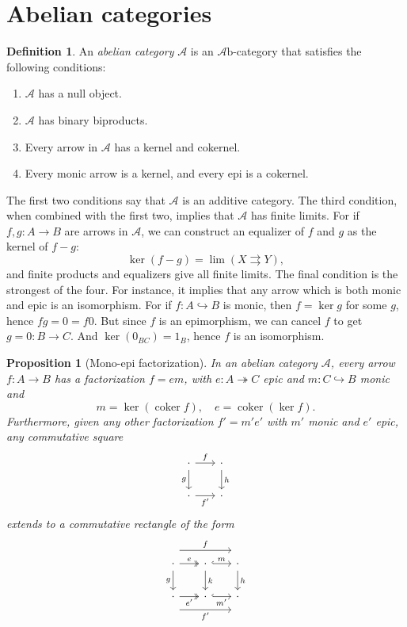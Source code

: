 \documentclass[10pt,oneside]{book}
\def\~#1{\mathscr{#1}}
\newcommand{\epi}{\twoheadrightarrow}
\newcommand{\mono}{\hookrightarrow}
\newcommand{\coker}{\mathop{\mathrm{coker}}}
\newcommand{\Ab}{\~A\mathrm{b}}
\theoremstyle{plain}
\newtheorem{prop}[thm]{Proposition}
\theoremstyle{definition}
\newtheorem{defn}[thm]{Definition}
\theoremstyle{remark}
\numberwithin{equation}{section}
\numberwithin{figure}{section}
\begin{document}
\section{Abelian categories}

\begin{defn}
    An \emph{abelian category} $\~A$ is an $\Ab$-category that satisfies the following conditions:
    \begin{enumerate}[label=(\roman*)]
        \item $\~A$ has a null object.
        \item $\~A$ has binary biproducts.
        \item Every arrow in $\~A$ has a kernel and cokernel.
        \item Every monic arrow is a kernel, and every epi is a cokernel.
    \end{enumerate}
\end{defn}

The first two conditions say that $\~A$ is an additive category. The third condition, when combined with the first two, implies that $\~A$ has finite limits. For if $f, g: A \to B$ are arrows in $\~A$, we can construct an equalizer of $f$ and $g$ as the kernel of $f - g$:
\[\ker(f-g) = \lim(X \rightrightarrows Y),\]
and finite products and equalizers give all finite limits. The final condition is the strongest of the four. For instance, it implies that any arrow which is both monic and epic is an isomorphism. For if $f: A \mono B$ is monic, then $f = \ker g$ for some $g$, hence $fg = 0 = f0$. But since $f$ is an epimorphism, we can cancel $f$ to get $g = 0: B \to C$. And $\ker(0_{BC}) = 1_B$, hence $f$ is an isomorphism.

\begin{prop}[Mono-epi factorization]
    In an abelian category $\~A$, every arrow $f:A \to B$ has a factorization $f = em$, with $e: A \epi C$ epic and $m: C \mono B$ monic and
    \[m = \ker(\coker f), \quad e = \coker(\ker f).\] 
    Furthermore, given any other factorization $f' = m'e'$ with $m'$ monic and $e'$ epic, any commutative square
    \[\begin{tikzcd}[column sep=scriptsize]
    \cdot & \cdot \\
    \cdot & \cdot
    \arrow["f", from=1-1, to=1-2]
    \arrow["g"', from=1-1, to=2-1]
    \arrow["h", from=1-2, to=2-2]
    \arrow["{f'}"', from=2-1, to=2-2]
\end{tikzcd}\]
extends to a commutative rectangle of the form
\[\begin{tikzcd}[column sep=scriptsize]
    \cdot & \cdot & \cdot \\
    \cdot & \cdot & \cdot
    \arrow["e", two heads, from=1-1, to=1-2]
    \arrow["f", shift left=5, from=1-1, to=1-3]
    \arrow["g"', from=1-1, to=2-1]
    \arrow["m", hook, from=1-2, to=1-3]
    \arrow["k", from=1-2, to=2-2]
    \arrow["h", from=1-3, to=2-3]
    \arrow["{e'}"', two heads, from=2-1, to=2-2]
    \arrow["{f'}"', shift right=5, from=2-1, to=2-3]
    \arrow["{m'}"', hook, from=2-2, to=2-3]
\end{tikzcd}\]
\end{prop}
\end{document}
